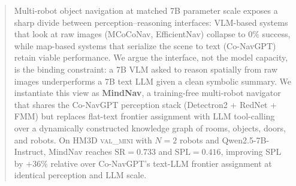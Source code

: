 \begin{abstract}
Multi-robot object navigation at matched 7B parameter scale exposes a sharp
divide between perception--reasoning interfaces: VLM-based systems that look at
raw images (MCoCoNav, EfficientNav) collapse to $0\%$ success, while map-based
systems that serialize the scene to text (Co-NavGPT) retain viable performance.
We argue the interface, not the model capacity, is the binding constraint: a
7B VLM asked to reason spatially from raw images underperforms a 7B text LLM
given a clean symbolic summary. We instantiate this view as \textbf{MindNav},
a training-free multi-robot navigator that shares the Co-NavGPT perception
stack (Detectron2 + RedNet + FMM) but replaces flat-text frontier assignment
with LLM tool-calling over a dynamically constructed knowledge graph of rooms,
objects, doors, and robots. On HM3D \textsc{val\_mini} with $N{=}2$ robots and
Qwen2.5-7B-Instruct, MindNav reaches $\mathrm{SR}{=}0.733$ and $\mathrm{SPL}{=}0.416$,
improving SPL by $+36\%$ relative over Co-NavGPT's text-LLM frontier assignment
at identical perception and LLM scale.
\end{abstract}

